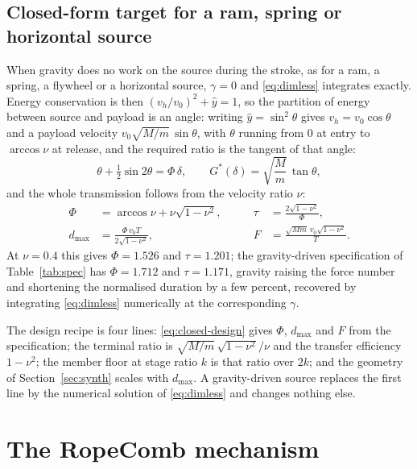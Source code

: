\documentclass[preprint,12pt,number]{elsarticle}
\newcommand{\Gstar}{G^{*}}
\newcommand{\dmax}{d_{\max}}
\begin{document}
\subsection{Closed-form target for a ram, spring or horizontal source}
\label{sec:closed}

When gravity does no work on the source during the stroke, as for a ram, a spring, a flywheel or a horizontal source, $\gamma = 0$ and \eqref{eq:dimless} integrates exactly. Energy conservation is then $(v_h/v_0)^2 + \hat y = 1$, so the partition of energy between source and payload is an angle: writing $\hat y = \sin^2\theta$ gives $v_h = v_0\cos\theta$ and a payload velocity $v_0\sqrt{M/m}\,\sin\theta$, with $\theta$ running from 0 at entry to $\arccos\nu$ at release, and the required ratio is the tangent of that angle:
\begin{equation}
\theta + \tfrac12 \sin 2\theta = \Phi\,\delta, \qquad \Gstar(\delta) = \sqrt{\frac{M}{m}}\,\tan\theta,
\label{eq:closed}
\end{equation}
and the whole transmission follows from the velocity ratio $\nu$:
\begin{equation}
\begin{aligned}
\Phi &= \arccos\nu + \nu\sqrt{1 - \nu^2}, &\qquad \tau &= \frac{2\sqrt{1 - \nu^2}}{\Phi}, \\
\dmax &= \frac{\Phi\,v_0 T}{2\sqrt{1 - \nu^2}}, &\qquad F &= \frac{\sqrt{Mm}\,v_0\sqrt{1 - \nu^2}}{T}.
\end{aligned}
\label{eq:closed-design}
\end{equation}
At $\nu = 0.4$ this gives $\Phi = 1.526$ and $\tau = 1.201$; the gravity-driven specification of Table~\ref{tab:spec} has $\Phi = 1.712$ and $\tau = 1.171$, gravity raising the force number and shortening the normalised duration by a few percent, recovered by integrating \eqref{eq:dimless} numerically at the corresponding $\gamma$.

The design recipe is four lines: \eqref{eq:closed-design} gives $\Phi$, $\dmax$ and $F$ from the specification; the terminal ratio is $\sqrt{M/m}\,\sqrt{1-\nu^2}/\nu$ and the transfer efficiency $1 - \nu^2$; the member floor at stage ratio $k$ is that ratio over $2k$; and the geometry of Section~\ref{sec:synth} scales with $\dmax$. A gravity-driven source replaces the first line by the numerical solution of \eqref{eq:dimless} and changes nothing else.

\section{The RopeComb mechanism}
\label{sec:mech}
\end{document}
